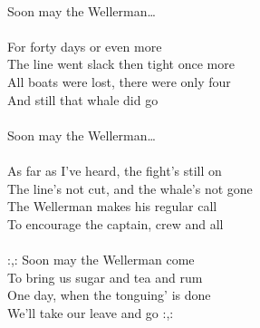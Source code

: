 \hspace{10mm} \\
            Soon may the Wellerman… \\
\hspace{10mm} \\
            For forty days or even more \\
            The line went slack then tight once more \\
            All boats were lost, there were only four \\
            And still that whale did go \\
\hspace{10mm} \\
            Soon may the Wellerman… \\
\hspace{10mm} \\
            As far as I've heard, the fight's still on \\
            The line's not cut, and the whale's not gone \\
            The Wellerman makes his regular call \\
            To encourage the captain, crew and all \\
\hspace{10mm} \\
            :,: Soon may the Wellerman come \\
            To bring us sugar and tea and rum \\
            One day, when the tonguing' is done \\
            We'll take our leave and go :,: \\
